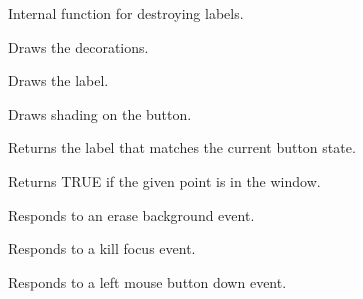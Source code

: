 Internal function for destroying labels.


\label{wxnewbitmapbuttondrawdecorations}


Draws the decorations.


\label{wxnewbitmapbuttondrawlabel}


Draws the label.


\label{wxnewbitmapbuttondrawshade}


Draws shading on the button.


\label{wxnewbitmapbuttongetstatelabel}


Returns the label that matches the current button state.


\label{wxnewbitmapbuttonisinwindow}


Returns TRUE if the given point is in the window.


\label{wxnewbitmapbuttononerasebackground}


Responds to an erase background event.


\label{wxnewbitmapbuttononkillfocus}


Responds to a kill focus event.


\label{wxnewbitmapbuttononlbuttondown}


Responds to a left mouse button down event.


\label{wxnewbitmapbuttononlbuttonup}

